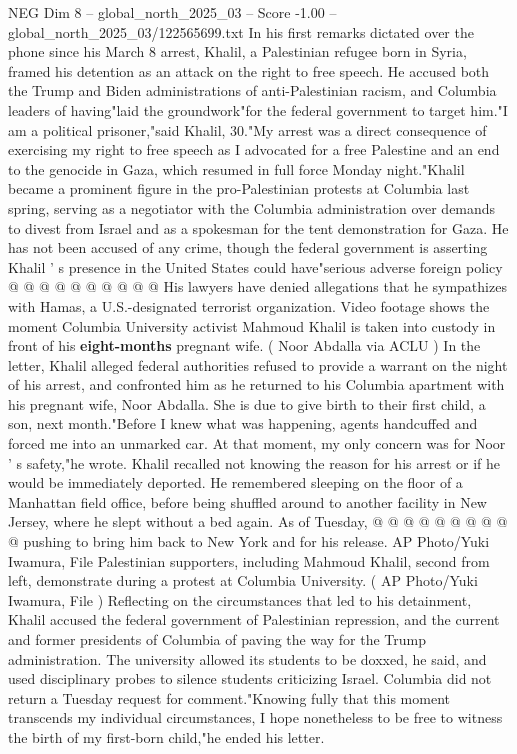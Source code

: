 \begin{textsample}{NEG Dim 8 – global\_north\_2025\_03 – Score -1.00 – global\_north\_2025\_03/122565699.txt}  \label{ex:f8_neg_366}
In his first remarks dictated over the phone since his March 8 arrest, Khalil, a Palestinian refugee born in Syria, framed his detention as an attack on the right to free speech.
He accused both the Trump and Biden administrations of anti-Palestinian racism, and Columbia leaders of having"laid the groundwork"for the federal government to target him."I am a political prisoner,"said Khalil, 30."My arrest was a direct consequence of exercising my right to free speech as I advocated for a free Palestine and an end to the genocide in Gaza, which resumed in full force Monday night."Khalil became a prominent figure in the pro-Palestinian protests at Columbia last spring, serving as a negotiator with the Columbia administration over demands to divest from Israel and as a spokesman for the tent demonstration for Gaza.
He has not been accused of any crime, though the federal government is asserting Khalil ' s presence in the United States could have"serious adverse foreign policy @ @ @ @ @ @ @ @ @ @ His lawyers have denied allegations that he sympathizes with Hamas, a U.S.-designated terrorist organization.
Video footage shows the moment Columbia University activist Mahmoud Khalil is taken into custody in front of his \textbf{eight-months} pregnant wife. ( Noor Abdalla via ACLU ) In the letter, Khalil alleged federal authorities refused to provide a warrant on the night of his arrest, and confronted him as he returned to his Columbia apartment with his pregnant wife, Noor Abdalla.
She is due to give birth to their first child, a son, next month."Before I knew what was happening, agents handcuffed and forced me into an unmarked car.
At that moment, my only concern was for Noor ' s safety,"he wrote.
Khalil recalled not knowing the reason for his arrest or if he would be immediately deported.
He remembered sleeping on the floor of a Manhattan field office, before being shuffled around to another facility in New Jersey, where he slept without a bed again.
As of Tuesday, @ @ @ @ @ @ @ @ @ @ pushing to bring him back to New York and for his release.
AP Photo/Yuki Iwamura, File Palestinian supporters, including Mahmoud Khalil, second from left, demonstrate during a protest at Columbia University. ( AP Photo/Yuki Iwamura, File ) Reflecting on the circumstances that led to his detainment, Khalil accused the federal government of Palestinian repression, and the current and former presidents of Columbia of paving the way for the Trump administration.
The university allowed its students to be doxxed, he said, and used disciplinary probes to silence students criticizing Israel.
Columbia did not return a Tuesday request for comment."Knowing fully that this moment transcends my individual circumstances, I hope nonetheless to be free to witness the birth of my first-born child,"he ended his letter.

\end{textsample}
